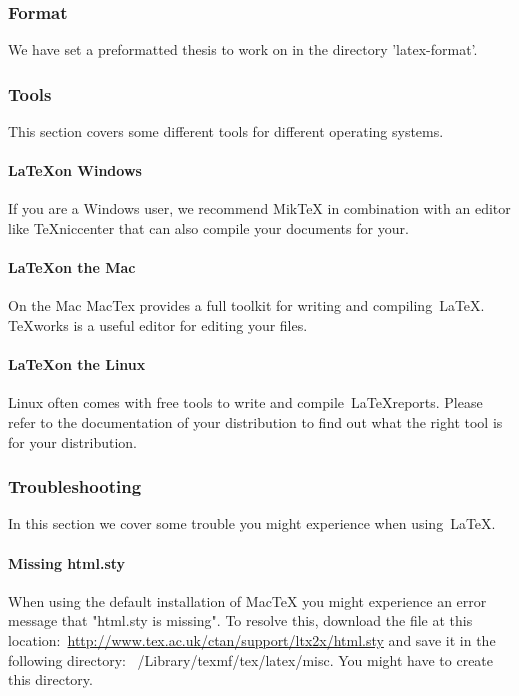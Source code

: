 \documentclass{latex-format/stylesheets/BEMNextstyle}
\begin{document}
\subsubsection*{Format}
We have set a preformatted thesis to work on in the directory 'latex-format'.

\subsubsection*{Tools}
This section covers some different tools for different operating systems.

\paragraph*{\LaTeX on Windows}
If you are a Windows user, we recommend MikTeX in combination with an editor like TeXniccenter that can also compile your documents for your.

\paragraph*{\LaTeX on the Mac}
On the Mac MacTex provides a full toolkit for writing and compiling~\LaTeX. TeXworks is a useful editor for editing your files.

\paragraph*{\LaTeX on the Linux}
Linux often comes with free tools to write and compile~\LaTeX reports. Please refer to the documentation of your distribution to find out what the right tool is for your distribution.

\subsubsection*{Troubleshooting}
In this section we cover some trouble you might experience when using~\LaTeX.

\paragraph*{Missing html.sty}
When using the default installation of MacTeX you might experience an error message that "html.sty is missing". To resolve this, download the file at this location:~\url{http://www.tex.ac.uk/ctan/support/ltx2x/html.sty} and save it in the following directory: ~/Library/texmf/tex/latex/misc. You might have to create this directory.
\end{document}
